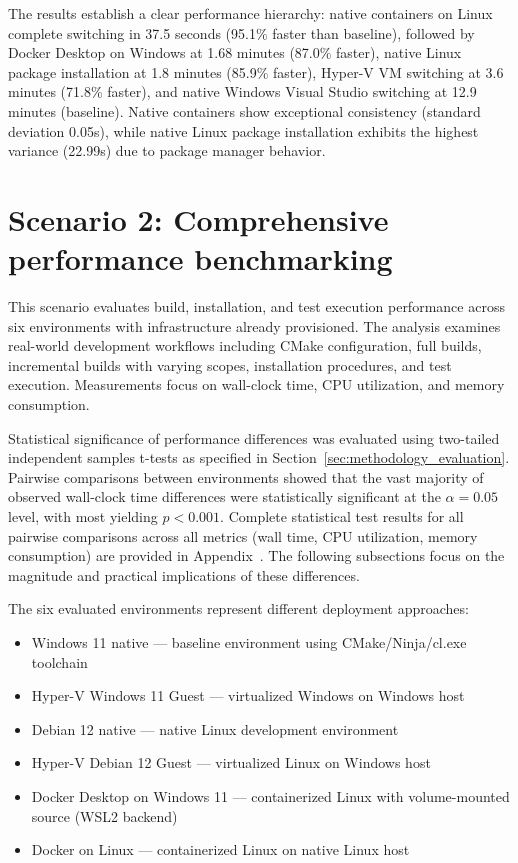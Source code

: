 The results establish a clear performance hierarchy: native containers on Linux complete switching in 37.5 seconds (95.1\% faster than baseline), followed by Docker Desktop on Windows at 1.68 minutes (87.0\% faster), native Linux package installation at 1.8 minutes (85.9\% faster), Hyper-V VM switching at 3.6 minutes (71.8\% faster), and native Windows Visual Studio switching at 12.9 minutes (baseline).
Native containers show exceptional consistency (standard deviation 0.05s), while native Linux package installation exhibits the highest variance (22.99s) due to package manager behavior.

\section{Scenario 2: Comprehensive performance benchmarking}

This scenario evaluates build, installation, and test execution performance across six environments with infrastructure already provisioned.
The analysis examines real-world development workflows including CMake configuration, full builds, incremental builds with varying scopes, installation procedures, and test execution.
Measurements focus on wall-clock time, CPU utilization, and memory consumption.

Statistical significance of performance differences was evaluated using two-tailed independent samples t-tests as specified in Section~\ref{sec:methodology_evaluation}.
Pairwise comparisons between environments showed that the vast majority of observed wall-clock time differences were statistically significant at the $\alpha = 0.05$ level, with most yielding $p < 0.001$.
Complete statistical test results for all pairwise comparisons across all metrics (wall time, CPU utilization, memory consumption) are provided in Appendix~.
The following subsections focus on the magnitude and practical implications of these differences.

The six evaluated environments represent different deployment approaches:
\begin{itemize}
    \item Windows 11 native --- baseline environment using CMake/Ninja/cl.exe toolchain
    \item Hyper-V Windows 11 Guest --- virtualized Windows on Windows host
    \item Debian 12 native --- native Linux development environment
    \item Hyper-V Debian 12 Guest --- virtualized Linux on Windows host
    \item Docker Desktop on Windows 11 --- containerized Linux with volume-mounted source (WSL2 backend)
    \item Docker on Linux --- containerized Linux on native Linux host
\end{itemize}

